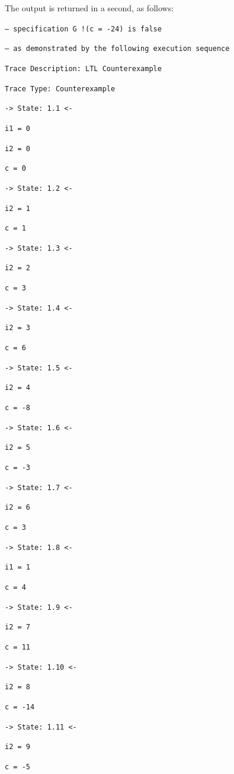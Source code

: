 \documentclass[12pt]{article}
\begin{document}
The output is returned in a second, as follows:
{
	\footnotesize
	
	{\tt -- specification  G !(c = -24)  is false }
	
	{\tt -- as demonstrated by the following execution sequence }
	
	{\tt Trace Description: LTL Counterexample  }
	
	{\tt Trace Type: Counterexample  }
	
	{\tt   -> State: 1.1 <- }
	
	{\tt     i1 = 0 }
	
	{\tt     i2 = 0 }
	
	{\tt     c = 0 }
	
	{\tt   -> State: 1.2 <- }
	
	{\tt     i2 = 1 }
	
	{\tt     c = 1 }
	
	{\tt   -> State: 1.3 <- }
	
	{\tt     i2 = 2 }
	
	{\tt     c = 3 }
	
	{\tt   -> State: 1.4 <- }
	
	{\tt     i2 = 3 }
	
	{\tt     c = 6 }
	
	{\tt   -> State: 1.5 <- }
	
	{\tt     i2 = 4 }
	
	{\tt     c = -8 }
	
	{\tt   -> State: 1.6 <- }
	
	{\tt     i2 = 5 }
	
	{\tt     c = -3 }
	
	{\tt   -> State: 1.7 <- }
	
	{\tt     i2 = 6 }
	
	{\tt     c = 3 }
	
	{\tt   -> State: 1.8 <- }
	
	{\tt     i1 = 1 }
	
	{\tt     c = 4 }
	
	{\tt   -> State: 1.9 <- }
	
	{\tt     i2 = 7 }
	
	{\tt     c = 11 }
	
	{\tt   -> State: 1.10 <- }
	
	{\tt     i2 = 8 }
	
	{\tt     c = -14 }
	
	{\tt   -> State: 1.11 <- }
	
	{\tt     i2 = 9 }
	
	{\tt     c = -5 }
	
}
\end{document}
